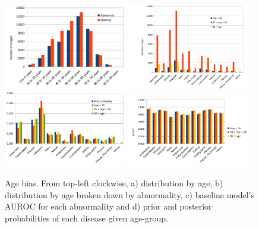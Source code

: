 \documentclass[12pt,oneside,a4paper]{report}
\begin{document}
\begin{figure}[H]
  \centering
  \includegraphics[width=0.48\textwidth]{images/charts/age_basic}\hspace{0.01\textwidth}%
  \includegraphics[width=0.48\textwidth]{images/charts/age_detailed}\\[0.01\textwidth]
  \includegraphics[width=0.48\textwidth]{images/charts/age_probs}\hspace{0.01\textwidth}%
  \includegraphics[width=0.48\textwidth]{images/charts/age_auc}\\[0.01\textwidth]
  \caption{Age bias. From top-left clockwise, a) distribution by age, b) distribution by age broken down by abnormality, c) baseline model's AUROC for each abnormality and d) prior and posterior probabilities of each disease given age-group.}
  \label{fig:age_bias}
\end{figure}
\end{document}
